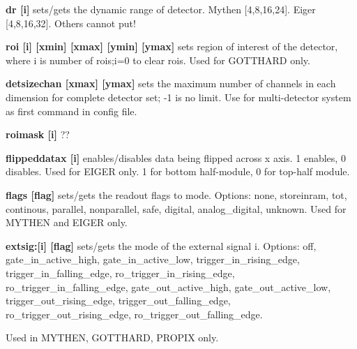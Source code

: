 \begin{DoxyItemize}
\item {\bfseries dr \mbox{[}i\mbox{]}} sets/gets the dynamic range of detector. Mythen \mbox{[}4,8,16,24\mbox{]}. Eiger \mbox{[}4,8,16,32\mbox{]}. Others cannot put!
\end{DoxyItemize}


\begin{DoxyItemize}
\item {\bfseries roi \mbox{[}i\mbox{]} \mbox{[}xmin\mbox{]} \mbox{[}xmax\mbox{]} \mbox{[}ymin\mbox{]} \mbox{[}ymax\mbox{]} } sets region of interest of the detector, where i is number of rois;i=0 to clear rois. Used for GOTTHARD only.
\end{DoxyItemize}


\begin{DoxyItemize}
\item {\bfseries detsizechan \mbox{[}xmax\mbox{]} \mbox{[}ymax\mbox{]}} sets the maximum number of channels in each dimension for complete detector set; -\/1 is no limit. Use for multi-\/detector system as first command in config file.
\end{DoxyItemize}


\begin{DoxyItemize}
\item {\bfseries roimask \mbox{[}i\mbox{]}} ??
\end{DoxyItemize}


\begin{DoxyItemize}
\item {\bfseries flippeddatax \mbox{[}i\mbox{]}} enables/disables data being flipped across x axis. 1 enables, 0 disables. Used for EIGER only. 1 for bottom half-\/module, 0 for top-\/half module.
\end{DoxyItemize}


\begin{DoxyItemize}
\item {\bfseries flags \mbox{[}flag\mbox{]}} sets/gets the readout flags to mode. Options: none, storeinram, tot, continous, parallel, nonparallel, safe, digital, analog\_\-digital, unknown. Used for MYTHEN and EIGER only.
\end{DoxyItemize}


\begin{DoxyItemize}
\item {\bfseries extsig:\mbox{[}i\mbox{]} \mbox{[}flag\mbox{]}} sets/gets the mode of the external signal i. Options: {\ttfamily off}, {\ttfamily gate\_\-in\_\-active\_\-high}, {\ttfamily gate\_\-in\_\-active\_\-low}, {\ttfamily trigger\_\-in\_\-rising\_\-edge}, {\ttfamily trigger\_\-in\_\-falling\_\-edge}, {\ttfamily ro\_\-trigger\_\-in\_\-rising\_\-edge}, {\ttfamily ro\_\-trigger\_\-in\_\-falling\_\-edge}, {\ttfamily gate\_\-out\_\-active\_\-high}, {\ttfamily gate\_\-out\_\-active\_\-low}, {\ttfamily trigger\_\-out\_\-rising\_\-edge}, {\ttfamily trigger\_\-out\_\-falling\_\-edge}, {\ttfamily ro\_\-trigger\_\-out\_\-rising\_\-edge}, {\ttfamily ro\_\-trigger\_\-out\_\-falling\_\-edge}. \par
 Used in MYTHEN, GOTTHARD, PROPIX only.
\end{DoxyItemize}


